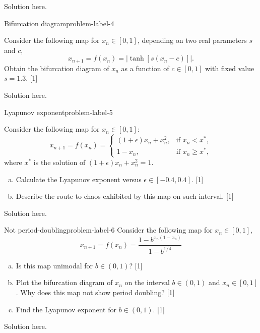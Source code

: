 Solution here.

\begin{problem}{Bifurcation diagram}{problem-label-4}

Consider the following map for $x_n \in [0,1]$, depending on two real parameters $s$ and $c$,
\[
    x_{n+1} = f(x_n) = |\tanh[s(x_n-c)]|.
\]
Obtain the bifurcation diagram of $x_n$ as a function of $c \in [0,1]$ with fixed value $s=1.3$. [1]

\end{problem}

Solution here.

\begin{problem}{Lyapunov exponent}{problem-label-5}

Consider the following map for $x_n \in [0,1]$:
\[
    x_{n+1} = f(x_n) = \begin{cases}
        (1+\epsilon)x_n + x_n^2, & \text{if } x_n < x^*, \\
        1-x_n, & \text{if } x_n \geq x^*,
    \end{cases}
\]
where $x^*$ is the solution of $(1+\epsilon)x_n + x_n^2 = 1$.

\begin{enumerate}[(a)]
    \item Calculate the Lyapunov exponent versus $\epsilon \in [-0.4, 0.4]$. [1]
    \item Describe the route to chaos exhibited by this map on such interval. [1]

\end{enumerate}
\end{problem}

Solution here.

\begin{problem}{Not period-doubling}{problem-label-6}
Consider the following map for $x_n \in [0,1],$
\[
    x_{n+1} = f(x_n) = \frac{1-b^{x_n(1-x_n)}}{1-b^{1/4}}
\]
\begin{enumerate}[(a)]
    \item Is this map unimodal for $b \in (0,1)$? [1]
    \item Plot the bifurcation diagram of $x_n$ on the interval $b \in (0,1)$ and $x_n \in [0,1]$.
    Why does this map not show period doubling? [1]
    \item Find the Lyapunov exponent for $b \in (0,1)$. [1]
\end{enumerate}

Solution here.

\end{problem}

\newpage
\vspace{0.1ex}




